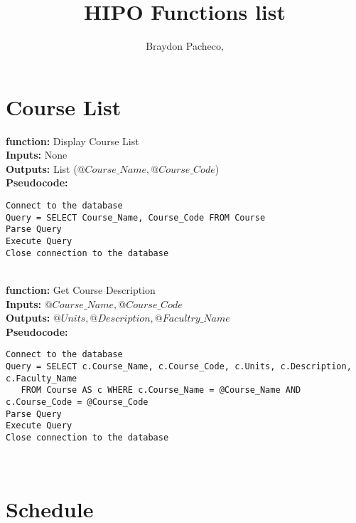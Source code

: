 \documentclass[11pt]{article} %
\title{HIPO Functions list}
\author{Braydon Pacheco,}
\begin{document}
\maketitle

\section{Course List}

\textbf{function:} Display Course List\\
\textbf{Inputs:} None\\
\textbf{Outputs:} List ($@Course\_Name, @Course\_Code$)\\
\textbf{Pseudocode:} 
\begin{verbatim}
Connect to the database
Query = SELECT Course_Name, Course_Code FROM Course
Parse Query
Execute Query
Close connection to the database
\end{verbatim} \\
\textbf{function:} Get Course Description\\
\textbf{Inputs:} $@Course\_Name, @Course\_Code$\\
\textbf{Outputs:} $@Units, @Description, @Facultry\_Name$\\
\textbf{Pseudocode:} 
\begin{verbatim}
Connect to the database
Query = SELECT c.Course_Name, c.Course_Code, c.Units, c.Description, c.Faculty_Name
   FROM Course AS c WHERE c.Course_Name = @Course_Name AND c.Course_Code = @Course_Code
Parse Query
Execute Query
Close connection to the database
\end{verbatim} \\
\section{Schedule}
\end{document}
